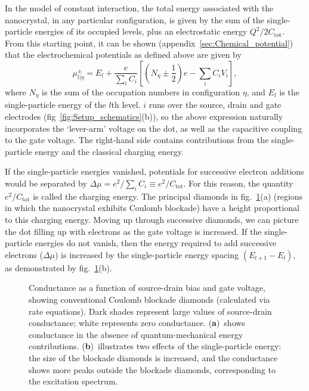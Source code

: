 \documentclass[a4paper,11pt]{article}
\begin{document}
    In the model of constant interaction, the total energy associated with the nanocrystal, in any particular configuration, is given by the sum of the single-particle energies of its occupied levels, plus an electrostatic energy $Q^2/2C_\mathrm{tot}$. From this starting point, it can be shown (appendix~\ref{sec:Chemical_potential}) that the electrochemical potentials as defined above are given by
    \begin{equation}\label{eqn:Chemical_potential}
        \mu^\pm_{l|\eta} = E_l + \frac{e}{\sum_i C_i}\left[\left(N_\eta \pm \frac{1}{2}\right)e - \sum_i C_i V_i\right],
    \end{equation}
    where $N_\eta$ is the sum of the occupation numbers in configuration $\eta$, and $E_l$ is the single-particle energy of the $l$th level. $i$ runs over the source, drain and gate electrodes (fig~\ref{fig:Setup_schematics}(b)), so the above expression naturally incorporates the `lever-arm' voltage on the dot, as well as the capacitive coupling to the gate voltage. The right-hand side contains contributions from the single-particle energy and the classical charging energy.

    If the single-particle energies vanished, potentials for successive electron additions would be separated by $\Delta \mu = e^2/\sum_i C_i \equiv e^2/C_\mathrm{tot}$. For this reason, the quantity $e^2/C_\mathrm{tot}$ is called the charging energy. The principal diamonds in fig.~\ref{fig:Degeneracy}(a) (regions in which the nanocrystal exhibits Coulomb blockade) have a height proportional to this charging energy. Moving up through successive diamonds, we can picture the dot filling up with electrons as the gate voltage is increased. If the single-particle energies do not vanish, then the energy required to add successive electrons ($\Delta \mu$) is increased by the single-particle energy spacing $\left(E_{l+1} - E_l\right)$, as demonstrated by fig.~\ref{fig:Degeneracy}(b).

    \begin{figure}[p]
    \begin{center}
        \caption{Conductance as a function of source-drain bias and gate voltage, showing conventional Coulomb blockade diamonds (calculated via rate equations). Dark shades represent large values of source-drain conductance; white represents zero conductance. (\textbf{a})~shows conductance in the absence of quantum-mechanical energy contributions. (\textbf{b})~illustrates two effects of the single-particle energy: the size of the blockade diamonds is increased, and the conductance shows more peaks outside the blockade diamonds, corresponding to the excitation spectrum.}
        \label{fig:Degeneracy}
    \end{center}
    \end{figure}
\end{document}
